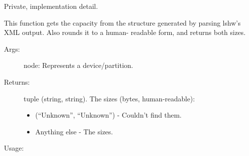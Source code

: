\documentclass[letterpaper,10pt,english]{sphinxmanual}
\begin{document}
\begin{fulllineitems}
\label{\detokenize{linux:getdevinfo.linux.get_capacity}}
Private, implementation detail.

This function gets the capacity from the structure generated
by parsing lshw’s XML output. Also rounds it to a human-
readable form, and returns both sizes.
\begin{description}
\item[{Args:}] \leavevmode
node:   Represents a device/partition.

\item[{Returns:}] \leavevmode
tuple (string, string). The sizes (bytes, human-readable):
\begin{itemize}
\item {} 
(“Unknown”, “Unknown”)     - Couldn’t find them.

\item {} 
Anything else              - The sizes.

\end{itemize}

\end{description}

Usage:

\begin{sphinxVerbatim}[commandchars=\\\{\}]
   
\end{sphinxVerbatim}

\end{fulllineitems}

\end{document}
